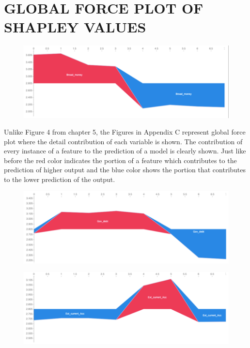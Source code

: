 \documentclass[12pt,italian, twoside]{report}
\begin{document}
\chapter{GLOBAL FORCE PLOT OF SHAPLEY VALUES}
\begin{figure}[t]
	\centering
	\includegraphics[width = 150mm]{immagini/bm.png}
\end{figure}
Unlike Figure 4 from chapter 5, the Figures in Appendix C represent global force plot where the detail contribution of each variable is shown. The contribution of every instance of a feature to the prediction of a model is clearly shown. Just like before the red color indicates the portion of a feature which contributes to the prediction of higher output and the blue color shows the portion that contributes to the lower prediction of the output. 
\begin{figure}[t]
	\centering
	\includegraphics[width = 150mm]{immagini/gd.png}
\end{figure}
\begin{figure}[t]
	\centering
	\includegraphics[width = 150mm]{immagini/ext.png}
\end{figure}
\end{document}
